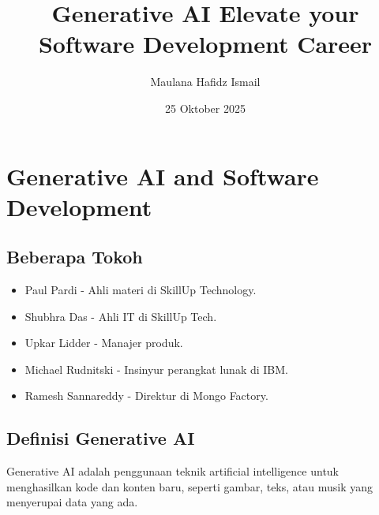 \documentclass{article}
\title{Generative AI Elevate your Software Development Career}
\date{25 Oktober 2025}
\author{Maulana Hafidz Ismail}
\begin{document}
\maketitle
\newpage

\tableofcontents
\newpage
{}

\section{Generative AI and Software Development}

\subsection{Beberapa Tokoh}
\begin{itemize}
    \item Paul Pardi - Ahli materi di SkillUp Technology.
    \item Shubhra Das - Ahli IT di SkillUp Tech.
    \item Upkar Lidder - Manajer produk.
    \item Michael Rudnitski - Insinyur perangkat lunak di IBM.
    \item Ramesh Sannareddy - Direktur di Mongo Factory.
\end{itemize}

\subsection{Definisi Generative AI}
Generative AI adalah penggunaan teknik artificial intelligence untuk menghasilkan kode dan konten baru, seperti gambar, teks, atau musik yang menyerupai data yang ada.
\end{document}
